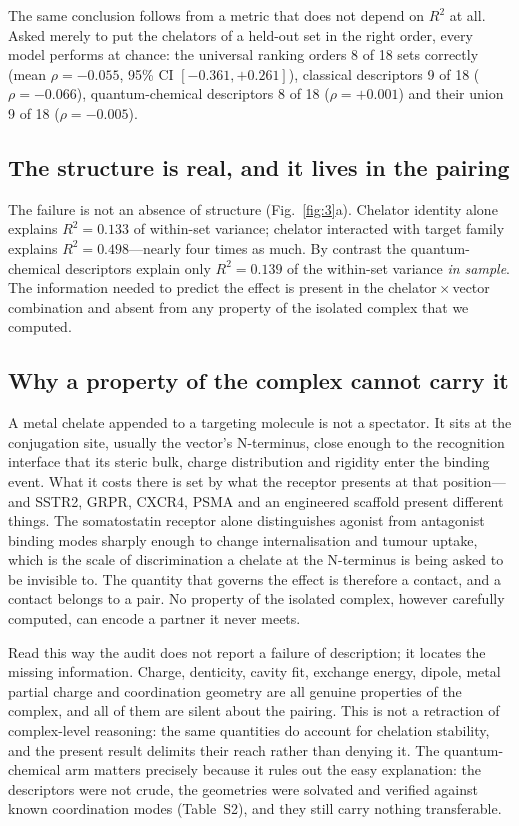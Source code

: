 \documentclass[twoside,twocolumn,9pt]{article}
\begin{document}
The same conclusion follows from a metric that does not depend on $R^2$ at all. Asked merely to put the chelators of a held-out set in the right order, every model performs at chance: the universal ranking orders 8 of 18 sets correctly (mean $\rho = -0.055$, 95\% CI $[-0.361, +0.261]$), classical descriptors 9 of 18 ($\rho = -0.066$), quantum-chemical descriptors 8 of 18 ($\rho = +0.001$) and their union 9 of 18 ($\rho = -0.005$).

\subsection{The structure is real, and it lives in the pairing}

The failure is not an absence of structure (Fig.~\ref{fig:3}a). Chelator identity alone explains $R^2 = 0.133$ of within-set variance; chelator interacted with target family explains $R^2 = 0.498$---nearly four times as much. By contrast the quantum-chemical descriptors explain only $R^2 = 0.139$ of the within-set variance \emph{in sample}. The information needed to predict the effect is present in the chelator\,$\times$\,vector combination and absent from any property of the isolated complex that we computed.

\subsection{Why a property of the complex cannot carry it}

A metal chelate appended to a targeting molecule is not a spectator. It sits at the conjugation site, usually the vector's N-terminus, close enough to the recognition interface that its steric bulk, charge distribution and rigidity enter the binding event. What it costs there is set by what the receptor presents at that position---and SSTR2, GRPR, CXCR4, PSMA and an engineered scaffold present different things. The somatostatin receptor alone distinguishes agonist from antagonist binding modes sharply enough to change internalisation and tumour uptake,\cite{Zhu2024SSTRanta,Zhang2024JR11} which is the scale of discrimination a chelate at the N-terminus is being asked to be invisible to. The quantity that governs the effect is therefore a contact, and a contact belongs to a pair. No property of the isolated complex, however carefully computed, can encode a partner it never meets.

Read this way the audit does not report a failure of description; it locates the missing information. Charge, denticity, cavity fit, exchange energy, dipole, metal partial charge and coordination geometry are all genuine properties of the complex, and all of them are silent about the pairing. This is not a retraction of complex-level reasoning: the same quantities do account for chelation stability,\cite{Kim2026ChelatorDFT} and the present result delimits their reach rather than denying it. The quantum-chemical arm matters precisely because it rules out the easy explanation: the descriptors were not crude, the geometries were solvated and verified against known coordination modes (Table~S2), and they still carry nothing transferable.
\end{document}

